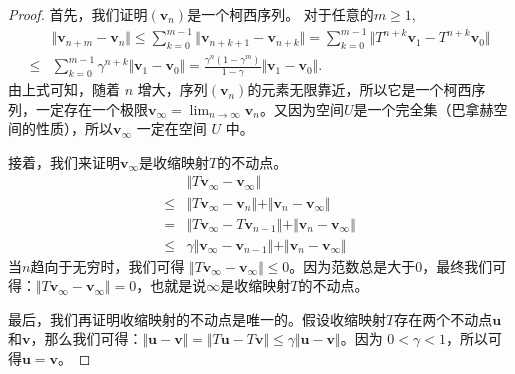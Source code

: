 \begin{proof}
    首先，我们证明$(\mathbf{v}_n)$是一个柯西序列。
    对于任意的$m \ge 1$, 
    \begin{align*}
        &\Vert \mathbf{v}_{n+m} - \mathbf{v}_n \Vert 
        \le \sum^{m-1}_{k=0} \Vert \mathbf{v}_{n+k+1} - \mathbf{v}_{n+k}\Vert
        = \sum^{m-1}_{k=0} \Vert T^{n+k}\mathbf{v}_1 - T^{n+k} \mathbf{v}_0\Vert\\
        \le& \sum^{m-1}_{k=0} \gamma^{n+k} \Vert \mathbf{v}_1 - \mathbf{v}_0 \Vert
        = \frac{\gamma^n(1 - \gamma^m)}{1 - \gamma} 
            \Vert \mathbf{v}_1 - \mathbf{v}_0 \Vert.
    \end{align*}
    由上式可知，随着 $n$ 增大，序列$(\mathbf{v}_n)$的元素无限靠近，所以它是一个柯西序列，一定存在一个极限$\mathbf{v}_{\infty} = \lim_{n\rightarrow\infty} \mathbf{v}_n$。又因为空间$U$是一个完全集（巴拿赫空间的性质），所以$\mathbf{v}_{\infty}$ 一定在空间 $U$ 中。

    接着，我们来证明$\mathbf{v}_{\infty}$是收缩映射$T$的不动点。
    \begin{align*}
        &\Vert T\mathbf{v}_{\infty} - \mathbf{v}_{\infty} \Vert\\
        \le& \Vert T\mathbf{v}_{\infty} - \mathbf{v}_{n}\Vert
        + \Vert \mathbf{v}_n - \mathbf{v}_{\infty} \Vert \\
        =& \Vert T\mathbf{v}_{\infty} - T \mathbf{v}_{n-1}\Vert
        + \Vert \mathbf{v}_n - \mathbf{v}_{\infty} \Vert \\
        \le& \gamma\Vert \mathbf{v}_{\infty} - \mathbf{v}_{n-1}\Vert
        + \Vert \mathbf{v}_n - \mathbf{v}_{\infty} \Vert 
    \end{align*}
    当$n$趋向于无穷时，我们可得 $\Vert T\mathbf{v}_{\infty} - \mathbf{v}_{\infty} \Vert\le 0$。因为范数总是大于0，最终我们可得：$\Vert T\mathbf{v}_{\infty} - \mathbf{v}_{\infty} \Vert = 0$，也就是说$\mathbf{\infty}$是收缩映射$T$的不动点。

    最后，我们再证明收缩映射的不动点是唯一的。假设收缩映射$T$存在两个不动点$\mathbf{u}$和$\mathbf{v}$，那么我们可得：$\Vert\mathbf{u} - \mathbf{v}\Vert = \Vert T \mathbf{u} - T\mathbf{v} \Vert \le \gamma \Vert \mathbf{u} - \mathbf{v} \Vert$。因为 $0 < \gamma < 1$，所以可得$\mathbf{u} = \mathbf{v}$。
\end{proof}

